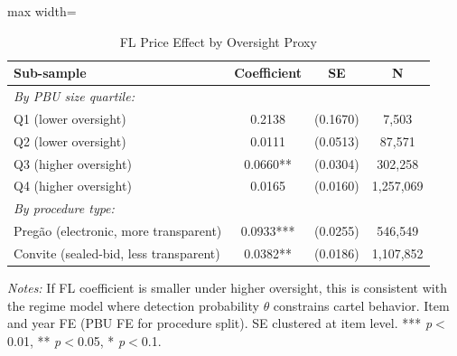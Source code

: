 \begin{table}[htbp]
\centering
\caption{FL Price Effect by Oversight Proxy}
\label{tab:regime_oversight}
\begin{adjustbox}{max width=\textwidth}
\begin{threeparttable}
\small
\begin{tabular}{lccc}
\toprule
Sub-sample & Coefficient & SE & N \\
\midrule
\textit{By PBU size quartile:} & & & \\
\quad Q1 (lower oversight) & 0.2138 & (0.1670) & 7,503 \\
\quad Q2 (lower oversight) & 0.0111 & (0.0513) & 87,571 \\
\quad Q3 (higher oversight) & 0.0660** & (0.0304) & 302,258 \\
\quad Q4 (higher oversight) & 0.0165 & (0.0160) & 1,257,069 \\
\midrule
\textit{By procedure type:} & & & \\
\quad Preg\~{a}o (electronic, more transparent) & 0.0933*** & (0.0255) & 546,549 \\
\quad Convite (sealed-bid, less transparent) & 0.0382** & (0.0186) & 1,107,852 \\
\bottomrule
\end{tabular}
\begin{tablenotes}
\small
\item \textit{Notes:} If FL coefficient is smaller under higher oversight,
this is consistent with the regime model where detection probability
$\theta$ constrains cartel behavior. Item and year FE (PBU FE for procedure split).
SE clustered at item level.
*** \textit{p}$<$0.01, ** \textit{p}$<$0.05, * \textit{p}$<$0.1.
\end{tablenotes}
\end{threeparttable}
\end{adjustbox}
\end{table}
